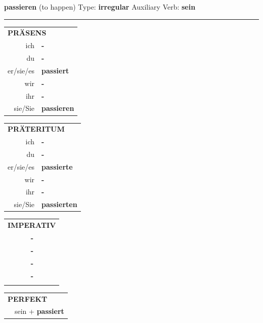 \documentclass[10pt,a4paper]{revtex4-2}
\begin{document}
\begin{verbbox}
    {\Large \bf passieren} (to happen) \hfill Type: \textbf{irregular} \hfill Auxiliary Verb: \textbf{sein} 
    
     \vspace{5pt}

    \hrule
    
    \vspace{5pt}

  \begin{tabular}{rl}
     \multicolumn{2}{l}{\textbf{PRÄSENS} }\\
    ich & \textbf{-}\\
    du & \textbf{-}\\
    er/sie/es & \textbf{passiert}\\
    wir & \textbf{-}\\
    ihr & \textbf{-}\\
    sie/Sie & \textbf{passieren}\\
  \end{tabular}
  \hfill
     \begin{tabular}{rl}
    \multicolumn{2}{l}{\textbf{PRÄTERITUM} }\\
    ich & \textbf{-}\\
    du & \textbf{-}\\
    er/sie/es & \textbf{passierte}\\
    wir & \textbf{-}\\
    ihr & \textbf{-}\\
    sie/Sie & \textbf{passierten}\\
  \end{tabular}
  \hfill
  \begin{tabular}{rl}
     \multicolumn{2}{l}{\textbf{IMPERATIV} }\\
   & \textbf{-}\\
   & \textbf{-}\\
   & \textbf{-}\\
   & \textbf{-}\\
   & \vspace{10pt}
  \end{tabular}

    \vspace{10pt}

 \begin{tabular}{rl}
     \multicolumn{2}{l}{\textbf{PERFEKT}}\\
   & sein + \textbf{passiert}\\
  \end{tabular}
\hfill
   \begin{tabular}{rl}
   

\end{tabular}
\end{verbbox}
\end{document}
